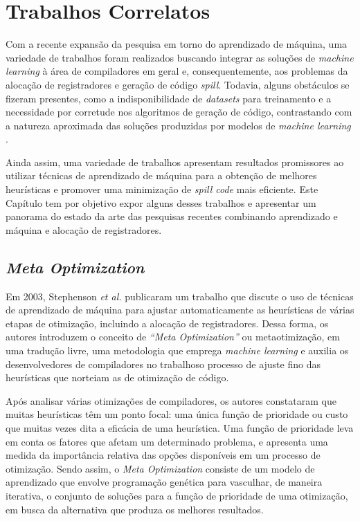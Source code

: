 \documentclass[
	12pt,				%
	openright,			%
	oneside,			%
	a4paper,			%
	tccpreliminar,			%
	]{ABNT-DC-UEL}
\begin{document}
\chapter{Trabalhos Correlatos} \label{sec:trabalhos-correlatos}

Com a recente expansão da pesquisa em torno do aprendizado de máquina, uma variedade de trabalhos foram realizados buscando integrar as soluções de \textit{machine learning} à área de compiladores em geral e, consequentemente, aos problemas da alocação de registradores e geração de código \textit{spill}. Todavia, alguns obstáculos se fizeram presentes, como a indisponibilidade de \textit{datasets} para treinamento e a necessidade por corretude nos algoritmos de geração de código, contrastando com a natureza aproximada das soluções produzidas por modelos de \textit{machine learning} \cite{venkatakeerthy:23}.

Ainda assim, uma variedade de trabalhos apresentam resultados promissores ao utilizar técnicas de aprendizado de máquina para a obtenção de melhores heurísticas e promover uma minimização de \textit{spill code} mais eficiente. Este Capítulo tem por objetivo expor alguns desses trabalhos e apresentar um panorama do estado da arte das pesquisas recentes combinando aprendizado e máquina e alocação de registradores.

\section{\textit{Meta Optimization}}

Em 2003, Stephenson \textit{et al.} \cite{amarasinghe:03} publicaram um trabalho que discute o uso de técnicas de aprendizado de máquina para ajustar automaticamente as heurísticas de várias etapas de otimização, incluindo a alocação de registradores. Dessa forma, os autores introduzem o conceito de \textit{``Meta Optimization''} ou metaotimização, em uma tradução livre, uma metodologia que emprega \textit{machine learning} e auxilia os desenvolvedores de compiladores no trabalhoso processo de ajuste fino das heurísticas que norteiam as de otimização de código.

Após analisar várias otimizações de compiladores, os autores constataram que muitas heurísticas têm um ponto focal: uma única função de prioridade ou custo que muitas vezes dita a eficácia de uma heurística. Uma função de prioridade leva em conta os fatores que afetam um determinado problema, e apresenta uma medida da importância relativa das opções disponíveis em um processo de otimização. Sendo assim, o \textit{Meta Optimization} consiste de um modelo de aprendizado que envolve programação genética para vasculhar, de maneira iterativa, o conjunto de soluções para a função de prioridade de uma otimização, em busca da alternativa que produza os melhores resultados.
\end{document}
